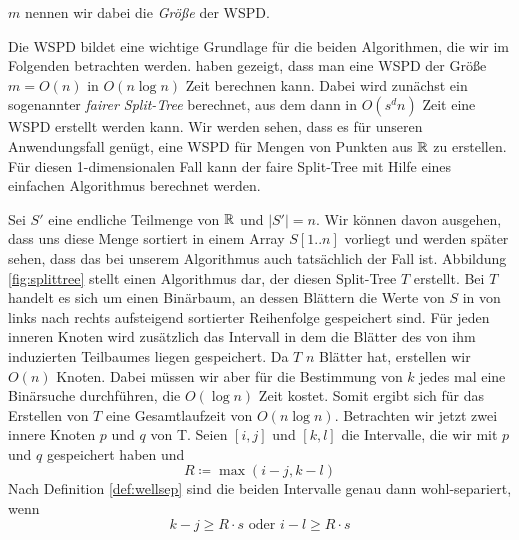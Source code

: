 	\noindent $m$ nennen wir dabei die \emph{Größe} der WSPD.

	Die WSPD bildet eine wichtige Grundlage für die beiden Algorithmen, die wir im Folgenden betrachten werden. 
	\textellipsis haben gezeigt, dass man eine WSPD der Größe $m = O(n)$ in $O(n\log n)$ Zeit berechnen kann. 
	Dabei wird zunächst ein sogenannter \emph{fairer Split-Tree} berechnet, aus dem dann in $O(s^dn)$ Zeit eine WSPD erstellt werden kann. 
	Wir werden sehen, dass es für unseren Anwendungsfall genügt, eine WSPD für Mengen von Punkten aus $\mathbb{R}$ zu erstellen. 
	Für diesen 1-dimensionalen Fall kann der faire Split-Tree mit Hilfe eines einfachen Algorithmus berechnet werden.
	
	
	
	Sei $S'$ eine endliche Teilmenge von $\mathbb{R}$ und $|S'| = n$. Wir können davon ausgehen, dass uns diese Menge sortiert in einem Array $S[1..n]$ vorliegt und werden später sehen, dass das bei unserem Algorithmus auch tatsächlich der Fall ist. Abbildung \ref{fig:splittree} stellt einen Algorithmus dar, der diesen Split-Tree $T$ erstellt. Bei $T$ handelt es sich um einen Binärbaum, an dessen Blättern die Werte von $S$ in von links nach rechts aufsteigend sortierter Reihenfolge gespeichert sind. Für jeden inneren Knoten wird zusätzlich das Intervall in dem die Blätter des von ihm induzierten Teilbaumes liegen gespeichert.
	Da $T$ $n$ Blätter hat, erstellen wir $O(n)$ Knoten. Dabei müssen wir aber für die Bestimmung von $k$ jedes mal eine Binärsuche durchführen, die $O(\log n)$ Zeit kostet. Somit ergibt sich für das Erstellen von $T$ eine Gesamtlaufzeit von $O(n\log n)$.
	Betrachten wir jetzt zwei innere Knoten $p$ und $q$ von T. Seien $[i, j]$ und $[k, l]$ die Intervalle, die wir mit $p$ und $q$ gespeichert haben und 
	\[R \coloneqq \max(i - j, k - l)\]
	Nach Definition \ref{def:wellsep} sind die beiden Intervalle genau dann wohl-separiert, wenn 
	\[k - j \geq R \cdot s \text{ oder } i - l \geq R \cdot s \]
	
	
	
